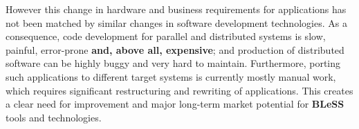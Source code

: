 \documentclass[a4paper,11pt]{article}
\newcommand{\project}[1]{\textbf{#1}\xspace}
\newcommand{\BLESS}{\project{BLeSS}}
\newcommand{\TheProject}{\BLESS}
\begin{document}
However this change in hardware and business requirements for applications has not been matched by similar changes in software development technologies.  As a consequence, code development for parallel and distributed systems is slow, painful, error-prone \textbf{and, above all, expensive}; and production of distributed software can be highly buggy and very hard to maintain. Furthermore, porting such applications to different target systems is currently mostly manual work, which requires significant restructuring and rewriting of applications. This creates a clear need for improvement and major long-term market potential for \TheProject tools and technologies.

\end{document}
